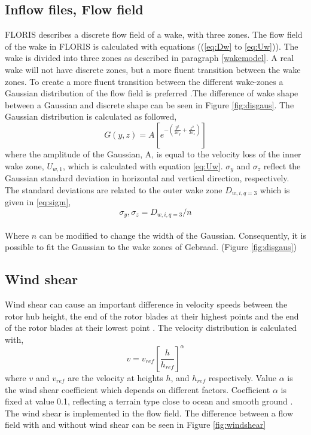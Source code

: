 \subsection{Inflow files, Flow field} FLORIS describes a discrete flow field of a wake, with three zones. The flow field of the wake in FLORIS is calculated with equations ((\ref{eq:Dw} to \ref{eq:Uw})). The wake is divided into three zones as described in paragraph \ref{wakemodel}. A real wake will not have discrete zones, but a more fluent transition between the wake zones. To create a more fluent transition between the different wake-zones a Gaussian distribution of the flow field is preferred \cite{Bastankhah2016}.The difference of wake shape between a Gaussian and discrete shape can be seen in Figure \ref{fig:disgaus}.  The Gaussian distribution is calculated as followed, 
\begin{equation}
\label{eq:gaus}
G(y, z) = A [e^{-(\frac{y^2}{2\sigma_y} + \frac{z^2}{2\sigma_z})}]
\end{equation}
where the amplitude of the Gaussian, A, is equal to the velocity loss of the inner wake zone, $U_{w,1}$, which is calculated with equation \ref{eq:Uw}. $\sigma_y$ and $\sigma_z$ reflect the Gaussian standard deviation in horizontal and vertical direction, respectively. The standard deviations are related to the outer wake zone $D_{w,i,q=3}$ which is given in \ref{eq:sigm},
\begin{equation}
\label{eq:sigm}
\sigma_y,\sigma_z = D_{w,i,q=3}/n 
\end{equation}
\\
Where $n$ can be modified to change the width of the Gaussian. Consequently, it is possible to fit the Gaussian to the wake zones of Gebraad. (Figure \ref{fig:disgaus})


\subsection{Wind shear}
Wind shear can cause an important difference in velocity speeds between the rotor hub height, the end of the rotor blades at their highest points and the end of the rotor blades at their lowest point \cite{Firtin2011}.  The velocity distribution is calculated with, 
\begin{equation}
\label{eq:shear}
v = v_{ref} \left[\frac{h}{h_{ref}}\right]^\alpha
\end{equation}
where $v$ and $v_{ref}$ are the velocity at heights $h$, and $h_{ref}$  respectively. Value $\alpha$ is the wind shear coefficient which depends on different factors. Coefficient $\alpha$ is fixed at value 0.1, reflecting a terrain type close to ocean and smooth ground \cite{Firtin2011}. The wind shear is implemented in the flow field. The difference between a flow field with and without wind shear can be seen in Figure \ref{fig:windshear}

